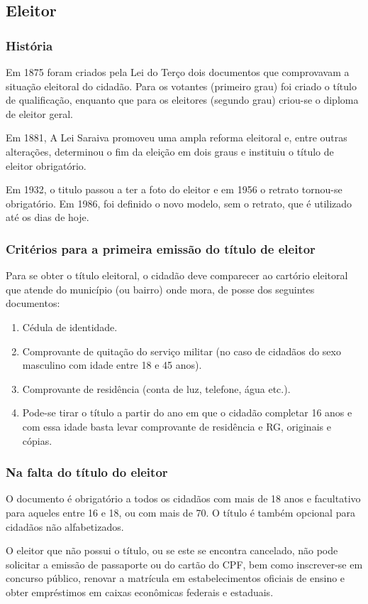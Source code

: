 \documentclass[a4paper,10pt]{article}
\begin{document}
\subsection{Eleitor}
\subsubsection{História}
Em 1875 foram criados pela Lei do Terço dois documentos que comprovavam a situação eleitoral do cidadão. Para os votantes (primeiro grau) foi criado o título de qualificação, enquanto que para os eleitores (segundo grau) criou-se o diploma de eleitor geral.

Em 1881, A Lei Saraiva promoveu uma ampla reforma eleitoral e, entre outras alterações, determinou o fim da eleição em dois graus e instituiu o título de eleitor obrigatório.

Em 1932, o titulo passou a ter a foto do eleitor e em 1956 o retrato tornou-se obrigatório. Em 1986, foi definido o novo modelo, sem o retrato, que é utilizado até os dias de hoje.
\subsubsection{Critérios para a primeira emissão do título de eleitor}
Para se obter o título eleitoral, o cidadão deve comparecer ao cartório eleitoral que atende do município (ou bairro) onde mora, de posse dos seguintes documentos:
\begin{enumerate}
\item Cédula de identidade.
\item Comprovante de quitação do serviço militar (no caso de cidadãos do sexo masculino com idade entre 18 e 45 anos).
\item Comprovante de residência (conta de luz, telefone, água etc.).
\item Pode-se tirar o título a partir do ano em que o cidadão completar 16 anos e com essa idade basta levar comprovante de residência e RG, originais e cópias.
\end{enumerate}
\subsubsection{Na falta do título do eleitor}
O documento é obrigatório a todos os cidadãos com mais de 18 anos e facultativo para aqueles entre 16 e 18, ou com mais de 70. O título é também opcional para cidadãos não alfabetizados.

O eleitor que não possui o título, ou se este se encontra cancelado, não pode solicitar a emissão de passaporte ou do cartão do CPF, bem como inscrever-se em concurso público, renovar a matrícula em estabelecimentos oficiais de ensino e obter empréstimos em caixas econômicas federais e estaduais.
\end{document}
